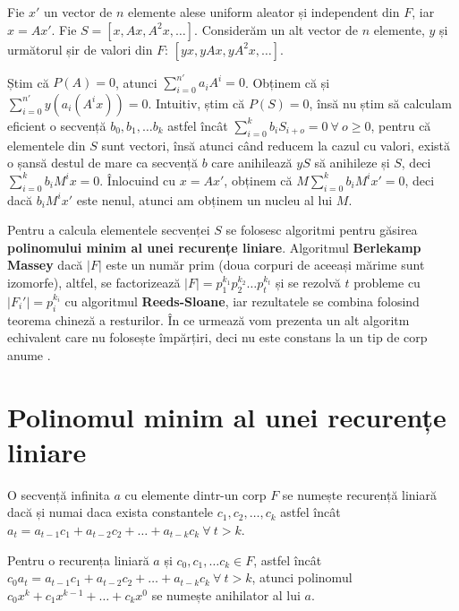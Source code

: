 Fie $x'$ un vector de $n$ elemente alese uniform aleator și independent din $F$,
iar $x = Ax'$. Fie $S = [x, Ax, A^{2}x, \ldots]$.
Considerăm un alt vector de $n$ elemente, $y$ și următorul șir de valori din $F$: $[yx, yAx, yA^{2}x, \ldots ]$.

Știm că $P(A) = 0$, atunci $\displaystyle\sum\limits_{i=0}^{n'} a_{i} A^{i} = 0$. Obținem că și
$\displaystyle\sum\limits_{i=0}^{n'} y (a_{i} (A^{i} x)) = 0$. Intuitiv, știm că $P(S) = 0$, însă nu
știm să calculam eficient o secvență $b_{0}, b_{1}, \ldots b_{k}$ astfel încât
$\displaystyle\sum\limits_{i=0}^{k} b_{i} S_{i+o} = 0 \ \forall \ o \geq 0$, pentru că elementele din $S$ sunt vectori, însă
atunci când reducem la cazul cu valori, există o șansă destul de mare ca secvență $b$
care anihilează $yS$ să anihileze și $S$, deci
$\displaystyle\sum\limits_{i=0}^{k} b_{i} M^{i}x = 0$.
Înlocuind cu $x = Ax'$, obținem că $M \displaystyle\sum\limits_{i=0}^{k} b_{i} M^{i} x' = 0$, deci
dacă $b_{i} M^{i} x'$ este nenul, atunci am obținem un nucleu al lui $M$.

Pentru a calcula elementele secvenței $S$ se folosesc algoritmi pentru găsirea
\textbf{polinomului minim al unei recurențe liniare}. Algoritmul
\textbf{Berlekamp Massey} dacă $|F|$ este un număr prim (doua corpuri de
aceeași mărime sunt izomorfe), altfel, se factorizează
$|F| = p_{1}^{k_{1}} p_{2}^{k_{2}} \ldots p_{t}^{k_{t}}$ și se rezolvă $t$
probleme cu $|F_{i}'| = p_{i}^{k_{i}}$ cu algoritmul \textbf{Reeds-Sloane}, iar
rezultatele se combina folosind teorema chineză a resturilor. În ce urmează vom
prezenta un alt algoritm echivalent care nu folosește împărțiri, deci nu este
constans la un tip de corp anume \cite{sugiyama}.

\pagebreak

\section{Polinomul minim al unei recurențe liniare}

\begin{defn}
  O secvență infinita $a$ cu elemente dintr-un corp $F$ se numește recurență
  liniară dacă și numai daca exista constantele $c_{1}, c_{2}, \ldots, c_{k}$
  astfel încât
  $a_{t} = a_{t-1}c_{1} + a_{t-2}c_{2} + \ldots + a_{t-k}c_{k} \ \forall \ t > k$.
\end{defn}

\begin{defn}
  Pentru o recurența liniară $a$ și $c_{0}, c_{1}, \ldots c_{k} \in F$, astfel
  încât
  $c_{0} a_{t} = a_{t-1}c_{1} + a_{t-2}c_{2} + \ldots + a_{t-k}c_{k} \ \forall \ t > k$,
  atunci polinomul $c_{0} x^{k} + c_{1} x^{k-1} + \ldots + c_{k} x^{0}$ se
  numește anihilator al lui $a$.
\end{defn}


